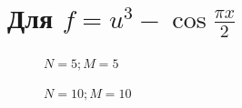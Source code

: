 \documentclass[12pt]{extarticle}
\numberwithin{equation}{section}
\begin{document}
\section{Для $f=u^3 - \cos \frac{\pi x}{2}$} 
\begin{figure}[H]
\begin{minipage}[h]{0.43\linewidth}
 $N=5; M=5$ \\
\end{minipage}
\hfill
\begin{minipage}[h]{0.43\linewidth}
 $N=10; M=10$ \\
\end{minipage}
\end{figure}
\end{document}
